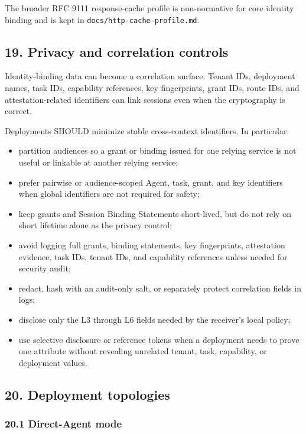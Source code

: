 \documentclass[
]{article}
\providecommand{\tightlist}{%
  \setlength{\itemsep}{0pt}\setlength{\parskip}{0pt}}
\begin{document}
The broader RFC 9111 response-cache profile is non-normative for core
identity binding and is kept in \texttt{docs/http-cache-profile.md}.

\subsection{19. Privacy and correlation
controls}\label{privacy-and-correlation-controls}

Identity-binding data can become a correlation surface. Tenant IDs,
deployment names, task IDs, capability references, key fingerprints,
grant IDs, route IDs, and attestation-related identifiers can link
sessions even when the cryptography is correct.

Deployments SHOULD minimize stable cross-context identifiers. In
particular:

\begin{itemize}
\tightlist
\item
  partition audiences so a grant or binding issued for one relying
  service is not useful or linkable at another relying service;
\item
  prefer pairwise or audience-scoped Agent, task, grant, and key
  identifiers when global identifiers are not required for safety;
\item
  keep grants and Session Binding Statements short-lived, but do not
  rely on short lifetime alone as the privacy control;
\item
  avoid logging full grants, binding statements, key fingerprints,
  attestation evidence, task IDs, tenant IDs, and capability references
  unless needed for security audit;
\item
  redact, hash with an audit-only salt, or separately protect
  correlation fields in logs;
\item
  disclose only the L3 through L6 fields needed by the receiver's local
  policy;
\item
  use selective disclosure or reference tokens when a deployment needs
  to prove one attribute without revealing unrelated tenant, task,
  capability, or deployment values.
\end{itemize}

\subsection{20. Deployment topologies}\label{deployment-topologies}

\subsubsection{20.1 Direct-Agent mode}\label{direct-agent-mode}
\end{document}
